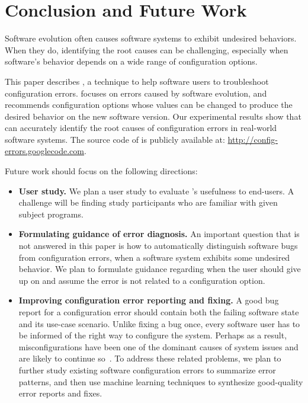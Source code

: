 \section{Conclusion and Future Work}
\label{sec:conclusion}

Software evolution often causes software systems to
exhibit undesired behaviors.
When they do, identifying the root causes
can be challenging, especially when software's
behavior depends on a wide range of configuration options.

This paper describes \ourtool, a technique to help software
users to troubleshoot configuration errors. \ourtool
focuses on errors caused by software evolution, and
recommends configuration options whose values can be changed to
produce the desired behavior on the new software version.
Our experimental results show that \ourtool
can accurately identify the root causes of
\errornum configuration errors in \subjnum real-world software systems.
The source code of \ourtool is publicly available
at: \url{http://config-errors.googlecode.com}.

Future work should focus on the following directions:

\vspace{-2mm}

\begin{itemize}
\item \textbf{User study.} We plan a user study to evaluate
\ourtool's usefulness to end-users. A challenge
will be finding study participants who are familiar
with given subject programs.

\item \textbf{Formulating guidance of error diagnosis.}
An important question that is not answered in this paper
is how to automatically distinguish software bugs from 
configuration errors, when a software system exhibits
some undesired behavior. We plan to formulate guidance
regarding when the user should give up on \ourtool
and assume the error is not related to a configuration option.

\item \textbf{Improving configuration error reporting and fixing.}
A good bug report for a configuration error should contain both the
failing software state and its use-case scenario.
Unlike fixing a bug once,
every software user has to be informed of the right way to
configure the system. Perhaps as a result, misconfigurations
have been one of the dominant causes of system issues and
are likely to continue so~\cite{Yin:2011:ESC}. To address these related problems,
we plan to further study existing software configuration errors
to summarize error patterns, and then use machine learning
techniques to synthesize good-quality error reports and fixes.

\end{itemize}

